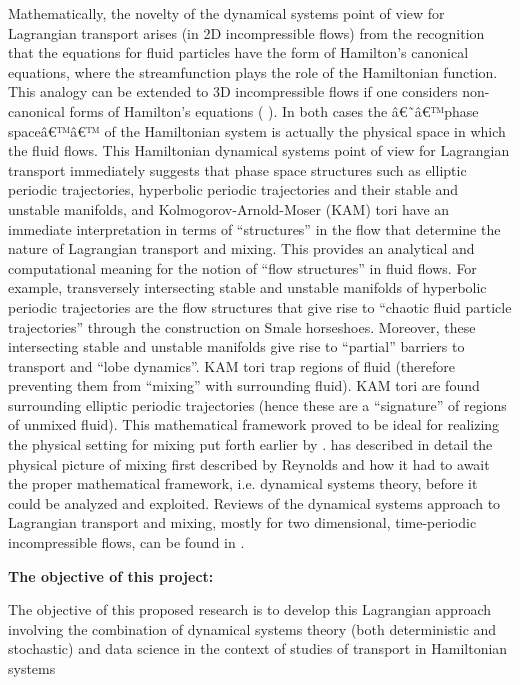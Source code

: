 \documentclass[11pt]{article}
\begin{document}
Mathematically, the novelty of the dynamical systems point of view for Lagrangian transport arises (in 2D incompressible flows) from the recognition that the equations for fluid particles have the form of Hamilton's canonical equations, where the streamfunction plays the role of the Hamiltonian function. This analogy can be extended to 3D incompressible flows  if one considers non-canonical forms of Hamilton's equations ( \cite{mw1,Contact2017,Contact2019}). In both cases the â€˜â€™phase spaceâ€™â€™ of the Hamiltonian system is actually the physical space in which the fluid flows. This Hamiltonian dynamical systems point of view for Lagrangian transport immediately suggests that phase space structures such as elliptic periodic trajectories, hyperbolic periodic trajectories and their stable and unstable manifolds, and Kolmogorov-Arnold-Moser (KAM) tori have an immediate interpretation in terms of ``structures'' in the flow that determine the nature of Lagrangian transport and mixing. This provides an analytical and computational meaning for the notion of ``flow structures'' in fluid flows. For example, transversely intersecting stable and unstable manifolds of hyperbolic periodic trajectories are the flow structures that give rise to ``chaotic fluid particle trajectories'' through the construction on Smale horseshoes. Moreover, these intersecting stable and unstable manifolds give rise to ``partial'' barriers to transport and ``lobe dynamics''. KAM tori trap regions of fluid (therefore preventing them from ``mixing'' with surrounding fluid). KAM tori are found surrounding elliptic periodic trajectories (hence these are a ``signature'' of regions of unmixed fluid). This mathematical framework proved to be ideal for realizing the physical setting for mixing put forth earlier by \cite{reynolds1894study, eckart1948analysis, danckwerts}. \cite{ottino1994reynolds} has described in detail the physical picture of mixing first described by Reynolds and how it had to await the proper mathematical framework, i.e. dynamical systems theory, before it could be analyzed and exploited. Reviews of the dynamical systems approach to Lagrangian transport and mixing, mostly for two dimensional, time-periodic incompressible flows, can be found in \cite{aref1, aref2,ott1, wigginsCT, wo, sow}.

 
   \textbf{The objective of this project:}


 The objective of this proposed research is to develop this Lagrangian approach involving the combination of dynamical systems theory (both deterministic and stochastic) and data science in the context of studies of transport in  
 Hamiltonian systems 
 
\end{document}
